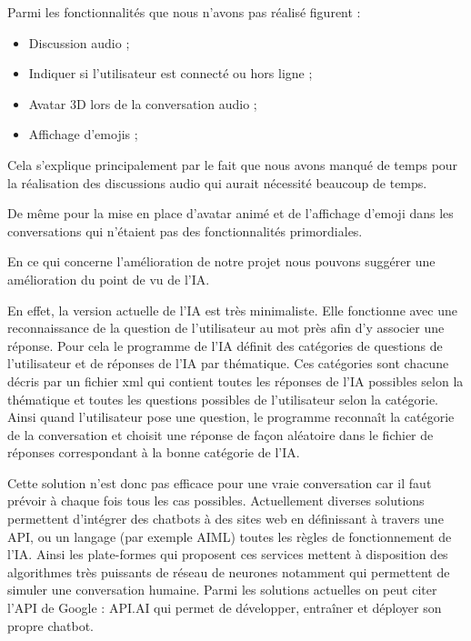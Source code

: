 
Parmi les fonctionnalités que nous n'avons pas réalisé figurent : 

\begin{itemize}
	\item Discussion audio ;
	\item Indiquer si l'utilisateur est connecté ou hors ligne ;
	\item Avatar 3D lors de la conversation audio ;
	\item Affichage d’emojis ;
\end{itemize}

\par Cela s'explique principalement par le fait que nous avons manqué de temps pour la réalisation des discussions audio qui aurait nécessité beaucoup de temps.

\par De même pour la mise en place d'avatar animé et de l'affichage d'emoji dans les conversations qui n'étaient pas des fonctionnalités primordiales.  \\


\par En ce qui concerne l’amélioration de notre projet nous pouvons suggérer une amélioration du point de vu de l'IA.

\par En effet, la version actuelle de l'IA est très minimaliste. Elle fonctionne avec une reconnaissance de la question de l'utilisateur au mot près afin d'y associer une réponse. Pour cela le programme de l'IA définit des catégories de questions de l'utilisateur et de réponses de l'IA par thématique. Ces catégories sont chacune décris par un fichier xml qui contient toutes les réponses de l'IA possibles selon la thématique et toutes les questions possibles de l’utilisateur selon la catégorie. Ainsi quand l'utilisateur pose une question, le programme reconnaît la catégorie de la conversation et choisit une réponse de façon aléatoire dans le fichier de réponses correspondant à la bonne catégorie de l'IA. 

\par Cette solution n'est donc pas efficace pour une vraie conversation car il faut prévoir à chaque fois tous les cas possibles. Actuellement diverses solutions permettent d'intégrer des chatbots à des sites web en définissant à travers une API, ou un langage (par exemple AIML) toutes les règles de fonctionnement de l'IA. Ainsi les plate-formes qui proposent ces services mettent à disposition des algorithmes très puissants de réseau de neurones notamment qui permettent de simuler une conversation humaine. Parmi les solutions actuelles on peut citer l'API de Google : API.AI qui permet de développer, entraîner et déployer son propre chatbot. 

